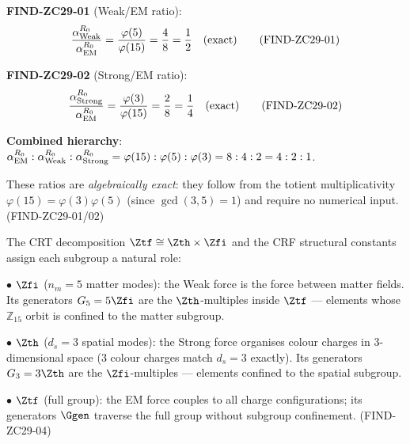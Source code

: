 \documentclass[12pt, a4paper]{article}
\begin{document}
\begin{derivedbox}[title={FIND-ZC29-01/02: Exact Force Ratios}]
\textbf{FIND-ZC29-01} (Weak/EM ratio):
\begin{equation}
  \frac{\alpha_{\rm Weak}^{R_0}}{\alpha_{\rm EM}^{R_0}}
  = \frac{\varphi(5)}{\varphi(15)}
  = \frac{4}{8}
  = \frac{1}{2}
  \quad\text{(exact)}
  \tag{FIND-ZC29-01}\label{zc29:find:wem}
\end{equation}

\textbf{FIND-ZC29-02} (Strong/EM ratio):
\begin{equation}
  \frac{\alpha_{\rm Strong}^{R_0}}{\alpha_{\rm EM}^{R_0}}
  = \frac{\varphi(3)}{\varphi(15)}
  = \frac{2}{8}
  = \frac{1}{4}
  \quad\text{(exact)}
  \tag{FIND-ZC29-02}\label{zc29:find:sem}
\end{equation}

\textbf{Combined hierarchy}:
$\alpha_{\rm EM}^{R_0} : \alpha_{\rm Weak}^{R_0} : \alpha_{\rm Strong}^{R_0}
= \varphi(15) : \varphi(5) : \varphi(3) = 8:4:2 = 4:2:1$.

These ratios are \emph{algebraically exact}: they follow from the
totient multiplicativity $\varphi(15) = \varphi(3)\varphi(5)$
(since $\gcd(3,5)=1$) and require no numerical input.
\hfill\textup{(FIND-ZC29-01/02)}
\end{derivedbox}

\begin{derivedbox}[title={FIND-ZC29-04: Physical Meaning of
  the Subgroup Structure}]
The CRT decomposition $\Ztf \cong \Zth \times \Zfi$ and the
CRF structural constants assign each subgroup a natural role:

\medskip
$\bullet$ $\Zfi$ ($n_m = 5$ matter modes): the Weak force is the
force between matter fields. Its generators $G_5 = 5\Zfi$ are
the $\Zth$-multiples inside $\Ztf$ --- elements whose
$\mathbb{Z}_{15}$ orbit is confined to the matter subgroup.

$\bullet$ $\Zth$ ($d_s = 3$ spatial modes): the Strong force
organises colour charges in 3-dimensional space (3 colour charges
match $d_s = 3$ exactly). Its generators $G_3 = 3\Zth$ are the
$\Zfi$-multiples --- elements confined to the spatial subgroup.

$\bullet$ $\Ztf$ (full group): the EM force couples to all
charge configurations; its generators $\Ggen$ traverse the full
group without subgroup confinement.
\hfill\textup{(FIND-ZC29-04)}
\end{derivedbox}

\end{document}
